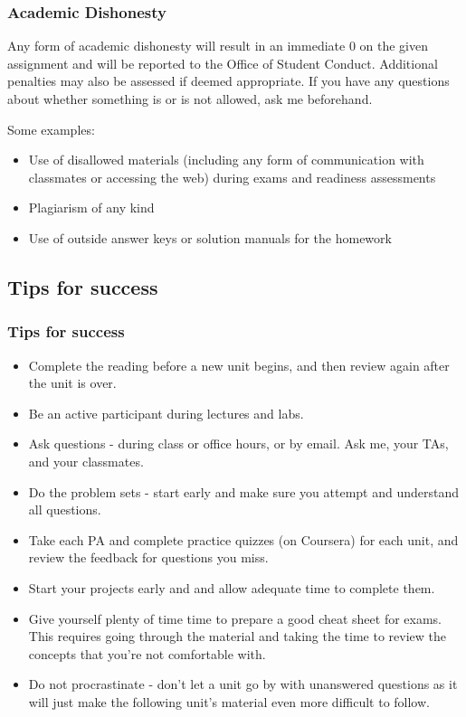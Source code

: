 \documentclass[slidestop,compress,mathserif,12pt,t,professionalfonts,xcolor=table]{beamer}
\begin{document}
\begin{frame}
\frametitle{Academic Dishonesty}

Any form of academic dishonesty will result in an immediate 0 on the given assignment 
and will be reported to the Office of Student Conduct. Additional penalties may also 
be assessed if deemed appropriate. If you have any questions about whether something 
is or is not allowed, ask me beforehand.

Some examples:

\begin{itemize}

\item Use of disallowed materials (including any form of communication with classmates 
or accessing the web) during exams and readiness assessments

\item Plagiarism of any kind

\item Use of outside answer keys or solution manuals for the homework

\end{itemize}

\end{frame}


\subsection{Tips for success}


\begin{frame}
\frametitle{Tips for success}

{\footnotesize
\begin{itemize}[<alert@+>]
\item Complete the reading before a new unit begins, and then review again after the 
unit is over.
\item Be an active participant during lectures and labs.
\item Ask questions - during class or office hours, or by email. Ask me, your TAs, and 
your classmates.
\item Do the problem sets - start early and make sure you attempt and understand all 
questions.
\item Take each PA and complete practice quizzes (on Coursera) for each unit, and
review the feedback for questions you miss.
\item Start your projects early and and allow adequate time to complete them.
\item Give yourself plenty of time time to prepare a good cheat sheet for exams. This 
requires going through the material and taking the time to review the concepts that 
you're not comfortable with.
\item Do not procrastinate - don't let a unit go by with unanswered questions as it 
will just make the following unit's material even more difficult to follow. 
\end{itemize}
}

\end{frame}
\end{document}
